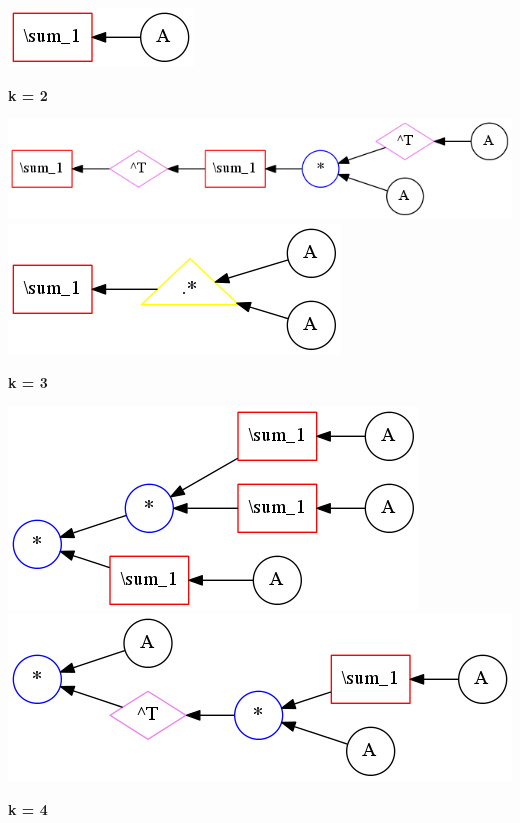 
\begin{center}
\includegraphics[width=0.45\linewidth]{trees/RBMOneSide_1_horizontal_0.png}
\end{center}


{\bf k = 2}


\begin{center}
\includegraphics[width=0.45\linewidth]{trees/RBMOneSide_2_horizontal_0.png}
\includegraphics[width=0.45\linewidth]{trees/RBMOneSide_2_horizontal_1.png}
\end{center}


{\bf k = 3}


\begin{center}
\includegraphics[width=0.45\linewidth]{trees/RBMOneSide_3_horizontal_0.png}
\includegraphics[width=0.45\linewidth]{trees/RBMOneSide_3_horizontal_1.png}
\end{center}


{\bf k = 4}


